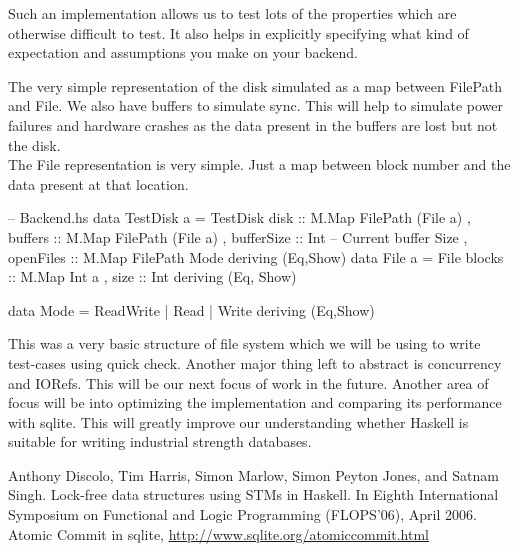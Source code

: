 \documentclass[11pt,a4paper]{article}
\begin{document}
Such an implementation allows us to test lots of the properties which are otherwise difficult to test. It also helps in explicitly specifying what kind of expectation and assumptions you make on your backend.

The very simple representation of the disk simulated as a map between FilePath and File. 
We also have buffers to simulate sync. This will help to simulate power failures and hardware crashes as the data present in the buffers are lost but not the disk. \\
The File representation is very simple. Just a map between block number and the data present at that location.

\begin{code}[name=Backend]
-- Backend.hs
data TestDisk a = TestDisk {
    disk :: M.Map FilePath (File a)
   , buffers :: M.Map FilePath (File a) 
   , bufferSize :: Int -- Current buffer Size 
   , openFiles :: M.Map FilePath Mode
    } deriving (Eq,Show)
data File a = File {
    blocks :: M.Map Int a 
   , size :: Int 
    } deriving (Eq, Show)

data Mode = ReadWrite | Read | Write deriving (Eq,Show) 
\end{code}

This was a very basic structure of file system which we will be using to write test-cases using quick check. Another major thing left to abstract is concurrency and IORefs. This will be our next focus of work in the future. Another area of focus will be into optimizing the implementation and comparing its performance with sqlite. This will greatly improve our understanding whether Haskell is suitable for writing industrial strength databases. 



\begin{thebibliography}{10}
Anthony Discolo, Tim Harris, Simon Marlow, Simon Peyton Jones, and Satnam Singh. Lock-free data structures using STMs in Haskell. In Eighth International Symposium on Functional and Logic Programming (FLOPS’06), April 2006.
Atomic Commit in sqlite, \url{http://www.sqlite.org/atomiccommit.html}
\end{thebibliography}
\end{document}
